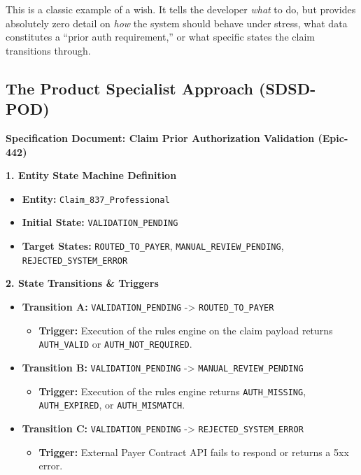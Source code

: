 \documentclass[
  11pt,
  openany,
  oneside]{book}
\providecommand{\tightlist}{%
  \setlength{\itemsep}{0pt}\setlength{\parskip}{0pt}}
\begin{document}
This is a classic example of a wish. It tells the developer \emph{what}
to do, but provides absolutely zero detail on \emph{how} the system
should behave under stress, what data constitutes a ``prior auth
requirement,'' or what specific states the claim transitions through.

\subsection{The Product Specialist Approach
(SDSD-POD)}\label{the-product-specialist-approach-sdsd-pod}

\textbf{Specification Document: Claim Prior Authorization Validation
(Epic-442)}

\textbf{1. Entity State Machine Definition}

\begin{itemize}
\tightlist
\item
  \textbf{Entity:} \texttt{Claim\_837\_Professional}
\item
  \textbf{Initial State:} \texttt{VALIDATION\_PENDING}
\item
  \textbf{Target States:} \texttt{ROUTED\_TO\_PAYER},
  \texttt{MANUAL\_REVIEW\_PENDING}, \texttt{REJECTED\_SYSTEM\_ERROR}
\end{itemize}

\textbf{2. State Transitions \& Triggers}

\begin{itemize}
\tightlist
\item
  \textbf{Transition A:} \texttt{VALIDATION\_PENDING} -\textgreater{}
  \texttt{ROUTED\_TO\_PAYER}

  \begin{itemize}
  \tightlist
  \item
    \textbf{Trigger:} Execution of the rules engine on the claim payload
    returns \texttt{AUTH\_VALID} or \texttt{AUTH\_NOT\_REQUIRED}.
  \end{itemize}
\item
  \textbf{Transition B:} \texttt{VALIDATION\_PENDING} -\textgreater{}
  \texttt{MANUAL\_REVIEW\_PENDING}

  \begin{itemize}
  \tightlist
  \item
    \textbf{Trigger:} Execution of the rules engine returns
    \texttt{AUTH\_MISSING}, \texttt{AUTH\_EXPIRED}, or
    \texttt{AUTH\_MISMATCH}.
  \end{itemize}
\item
  \textbf{Transition C:} \texttt{VALIDATION\_PENDING} -\textgreater{}
  \texttt{REJECTED\_SYSTEM\_ERROR}

  \begin{itemize}
  \tightlist
  \item
    \textbf{Trigger:} External Payer Contract API fails to respond or
    returns a 5xx error.
  \end{itemize}
\end{itemize}
\end{document}
